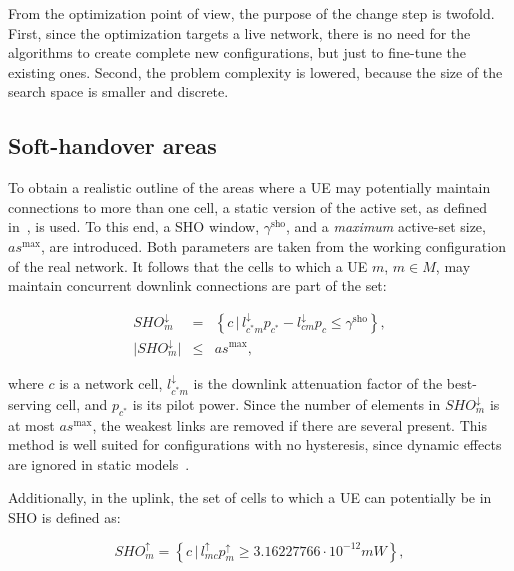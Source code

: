From the optimization point of view, the purpose of the change step
is twofold. First, since the optimization targets a live network,
there is no need for the algorithms to create complete new configurations,
but just to fine-tune the existing ones. Second, the problem complexity
is lowered, because the size of the search space is smaller and discrete.


\subsection{Soft-handover areas \label{sub:07-SHO_areas}}

To obtain a realistic outline of the areas where a UE may potentially
maintain connections to more than one cell, a static version of the
active set, as defined in~\cite{Nawrocki-Understanding_UMTS_radio_network_modelling_and_optimisation:2006},
is used. To this end, a SHO window, $\gamma^{\mathrm{sho}}$,
and a \textit{\emph{maximum}} active-set size, $as^{\mathrm{max}}$,
are introduced. Both parameters are taken from the working configuration
of the real network. It follows that the cells to which a UE $m$,
$m\in M$, may maintain concurrent downlink connections are part of
the set:

\begin{eqnarray}
SHO_{m}^{\downarrow} & = & \left\{ c\,\vert\, l_{c^{*}m}^{\downarrow}p_{c^{*}}-l_{cm}^{\downarrow}p_{c}\le\gamma^{\mathrm{sho}}\right\} ,\nonumber \\
\vert SHO_{m}^{\downarrow}\vert & \le & as^{\mathrm{max}},
\end{eqnarray}


\noindent where $c$ is a network cell, $l_{c^{*}m}^{\downarrow}$
is the downlink attenuation factor of the best-serving cell, and $p_{c^{*}}$
is its pilot power. Since the number of elements in $SHO_{m}^{\downarrow}$
is at most $as^{\mathrm{max}}$, the weakest links are removed if
there are several present. This method is well suited for configurations
with no hysteresis, since dynamic effects are ignored in static models~\cite{Nawrocki-Understanding_UMTS_radio_network_modelling_and_optimisation:2006}. 

Additionally, in the uplink, the set of cells to which a UE can potentially
be in SHO is defined as:

\begin{equation}
SHO_{m}^{\uparrow}=\left\{ c\,\vert\, l_{mc}^{\uparrow}p_{m}^{\uparrow}\ge3.16227766\cdot10^{-12}mW\right\} ,
\end{equation}


